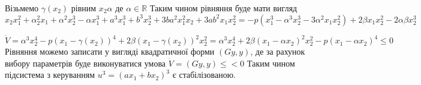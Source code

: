 \documentclass{article}
\begin{document}
Візьмемо $\gamma(x_2)$ рівним $x_2\alpha$ де $\alpha \in \mathbb{R}$
Таким чином рівняння буде мати вигляд
\begin{equation}
x_2x_{1}^2 + \alpha_{2}^2x_1 + \alpha^2x_2^3-\alpha x_{1}^3 +
a^3x_{1}^3 + b^3x_{2}^3+ 
3ba^2x_{1}^2x_2+3ab^2x_1x_{2}^2 = 
-p(x_1^3 - \alpha^{3}x_{2}^3 - 3\alpha^{2}x_1x_{2}^2)+
2\beta x_1x_{2}^2 - 2\alpha \beta x_2^3
\end{equation}


\begin{equation}
    \dot V = \alpha^3x_{2}^4 - p(x_1-\gamma(x_2))^4
    +2\beta(x_1-\gamma(x_2))^2x_{2}^2 = 
    \alpha^3x_{2}^4 + 2\beta(x_1-\alpha x_2)^2x_{2}^2
    -p(x_1-\alpha x_2)^4 \leq 0
\end{equation}
Рівняння можемо записати у вигляді квадратичної форми
$(Gy,y)$, де за рахунок вибору параметрів буде виконуватися
умова $\dot V =(Gy,y)\leq <0$ 
Таким чином підсистема з керуванням  $u^3=(ax_1+bx_2)^3$ 
є стабілізованою. 
\end{document}
